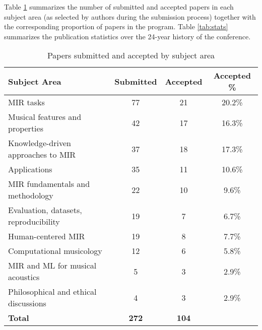 Table \ref{tab:subjects} summarizes the number of submitted and accepted papers in each subject area (as selected by authors during the submission process) together with the corresponding proportion of papers in the program. Table \ref{tab:stats} summarizes the publication statistics over the 24-year history of the conference.


\begin{table}[ht]
\caption{Papers submitted and accepted by subject area\label{tab:subjects}}
\centering
\begin{tabular}{l c c c}
\toprule
\textbf{Subject Area} & \textbf{Submitted} & \textbf{Accepted} & \textbf{Accepted \%} \\
\midrule
MIR tasks & 77 & 21 & 20.2\% \\
Musical features and properties & 42 & 17 & 16.3\% \\
Knowledge-driven approaches to MIR & 37 & 18 & 17.3\% \\
Applications & 35 & 11 & 10.6\% \\
MIR fundamentals and methodology & 22 & 10 & 9.6\% \\
Evaluation, datasets, reproducibility & 19 & 7 & 6.7\% \\
Human-centered MIR & 19 & 8 & 7.7\% \\
Computational musicology & 12 & 6 & 5.8\% \\
MIR and ML for musical acoustics & 5 & 3 & 2.9\% \\
Philosophical and ethical discussions & 4 & 3 & 2.9\%  \\
\midrule
\textbf{Total} & \textbf{272} & \textbf{104} &  \\
\bottomrule
\end{tabular}
\end{table}



